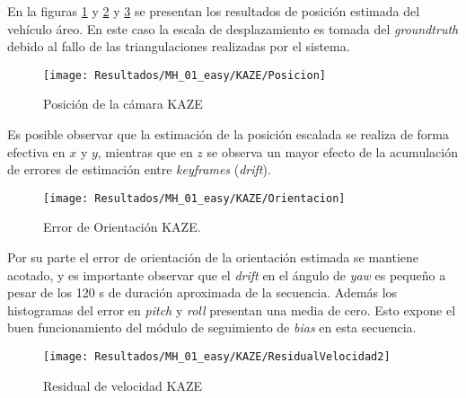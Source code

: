 En la figuras \ref{imagen:Resultados/MH_01_easy/KAZE/Posicion} y \ref{imagen:Resultados/MH_01_easy/KAZE/Orientacion} y \ref{imagen:Resultados/MH_01_easy/KAZE/ResidualVelocidad} se presentan los resultados de posición estimada del vehículo áreo. En este caso la escala de desplazamiento es tomada del \textit{groundtruth} debido al fallo de las triangulaciones realizadas por el sistema.
 
\begin{figure}[H]
	\centering
	\texttt{[image: Resultados/MH\_01\_easy/KAZE/Posicion]}
	\caption{Posición de la cámara KAZE}
	\label{imagen:Resultados/MH_01_easy/KAZE/Posicion}
\end{figure}

Es posible observar que la estimación de la posición escalada se realiza de forma efectiva  en $x$ y $y$, mientras que en $z$ se observa un mayor efecto de la acumulación de errores de estimación entre \textit{keyframes} (\textit{drift}).


\begin{figure}[H]
	\centering
	\texttt{[image: Resultados/MH\_01\_easy/KAZE/Orientacion]}
	\caption[Error de Orientación KAZE]{Error de Orientación KAZE.}
	\label{imagen:Resultados/MH_01_easy/KAZE/Orientacion}
\end{figure}

Por su parte el error de orientación de la orientación estimada se mantiene acotado, y es importante observar que el \textit{drift} en el ángulo de \textit{yaw} es pequeño a pesar de los 120 s de duración aproximada de la secuencia. Además los histogramas del error en \textit{pitch} y \textit{roll} presentan una media de cero. Esto expone el buen funcionamiento del módulo de seguimiento de \textit{bias} en esta secuencia. 

\begin{figure}[H]
	\centering
	\texttt{[image: Resultados/MH\_01\_easy/KAZE/ResidualVelocidad2]}
	\caption{Residual de velocidad KAZE}
	\label{imagen:Resultados/MH_01_easy/KAZE/ResidualVelocidad}
\end{figure}

%
%
%
%
%
%
%
%

